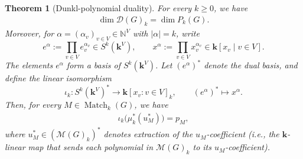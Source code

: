 \documentclass[12pt]{amsart}
\newtheorem{theorem}{Theorem}[section]
\theoremstyle{definition}
\theoremstyle{remark}
\newcommand{\kk}{\mathbf{k}}
\newcommand{\Match}{\operatorname{Match}}
\begin{document}
\begin{theorem}[Dunkl-polynomial duality]\label{thm:product-realization}
For every $k\geq0$, we have
\begin{align}\label{eq:dimD=dimP}
 \dim\mathcal D(G)_k=\dim P_k(G).
\end{align}
Moreover, for $\alpha=(\alpha_v)_{v\in V}\in\mathbb{N}^V$ with
$|\alpha|=k$, write
\[
 e^\alpha:=\prod_{v\in V}e_v^{\alpha_v} \in S^k(\kk^V),
 \qquad
 x^\alpha:=\prod_{v\in V}x_v^{\alpha_v} \in \kk[x_v \mid v \in V].
\]
The elements $e^\alpha$ form a basis of $S^k(\kk^V)$.  Let
$(e^\alpha)^*$ denote the dual basis, and define the linear isomorphism
\[
 \iota_k:S^k(\kk^V)^*\longrightarrow\kk[x_v:v\in V]_k,
 \qquad
 (e^\alpha)^*\longmapsto x^\alpha.
\]
Then, for every $M\in\Match_k(G)$, we have
\begin{align}\label{eq:iotamuu}
 \iota_k\bigl(\mu_k^*(u_M^*)\bigr)=p_M,
\end{align}
where $u_M^* \in (\mathcal M(G)_k)^*$ denotes extraction of
the $u_M$-coefficient (i.e., the $\kk$-linear map that sends each
polynomial in $\mathcal M(G)_k$ to its $u_M$-coefficient).
\end{theorem}
\end{document}
